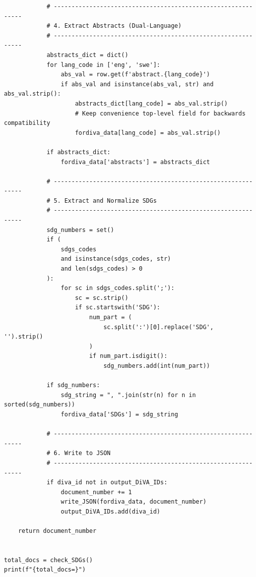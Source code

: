 \begin{lstlisting}
            # -------------------------------------------------------------
            # 4. Extract Abstracts (Dual-Language)
            # -------------------------------------------------------------
            abstracts_dict = dict()
            for lang_code in ['eng', 'swe']:
                abs_val = row.get(f'abstract.{lang_code}')
                if abs_val and isinstance(abs_val, str) and abs_val.strip():
                    abstracts_dict[lang_code] = abs_val.strip()
                    # Keep convenience top-level field for backwards compatibility
                    fordiva_data[lang_code] = abs_val.strip()

            if abstracts_dict:
                fordiva_data['abstracts'] = abstracts_dict

            # -------------------------------------------------------------
            # 5. Extract and Normalize SDGs
            # -------------------------------------------------------------
            sdg_numbers = set()
            if (
                sdgs_codes
                and isinstance(sdgs_codes, str)
                and len(sdgs_codes) > 0
            ):
                for sc in sdgs_codes.split(';'):
                    sc = sc.strip()
                    if sc.startswith('SDG'):
                        num_part = (
                            sc.split(':')[0].replace('SDG', '').strip()
                        )
                        if num_part.isdigit():
                            sdg_numbers.add(int(num_part))

            if sdg_numbers:
                sdg_string = ", ".join(str(n) for n in sorted(sdg_numbers))
                fordiva_data['SDGs'] = sdg_string

            # -------------------------------------------------------------
            # 6. Write to JSON
            # -------------------------------------------------------------
            if diva_id not in output_DiVA_IDs:
                document_number += 1
                write_JSON(fordiva_data, document_number)
                output_DiVA_IDs.add(diva_id)

    return document_number


total_docs = check_SDGs()
print(f"{total_docs=}")
\end{lstlisting}

